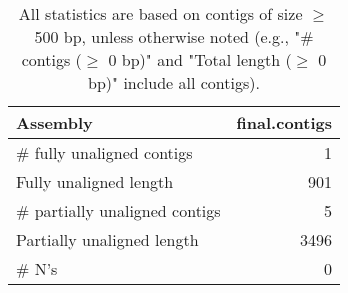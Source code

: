 \documentclass[12pt,a4paper]{article}
\begin{document}
\begin{table}[ht]
\begin{center}
\caption{All statistics are based on contigs of size $\geq$ 500 bp, unless otherwise noted (e.g., "\# contigs ($\geq$ 0 bp)" and "Total length ($\geq$ 0 bp)" include all contigs).}
\begin{tabular}{|l*{1}{|r}|}
\hline
Assembly & final.contigs \\ \hline
\# fully unaligned contigs & 1 \\ \hline
Fully unaligned length & 901 \\ \hline
\# partially unaligned contigs & 5 \\ \hline
Partially unaligned length & 3496 \\ \hline
\# N's & 0 \\ \hline
\end{tabular}
\end{center}
\end{table}
\end{document}

